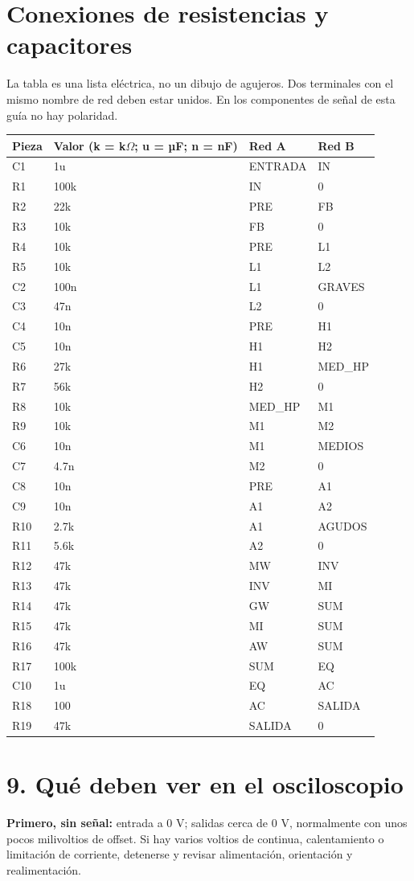 \documentclass[10pt,a4paper]{article}
\newcommand{\siguientepagina}{\clearpage}
\begin{document}
\clearpage
\section{Conexiones de resistencias y capacitores}
La tabla es una lista eléctrica, no un dibujo de agujeros. Dos terminales con el mismo nombre de red deben estar unidos. En los componentes de señal de esta guía no hay polaridad.
{\small\begin{longtable}{llll}\toprule Pieza & Valor (k = k\ensuremath{\Omega}; u = µF; n = nF) & Red A & Red B\\\midrule\endhead
C1 & 1u & ENTRADA & IN \\
R1 & 100k & IN & 0 \\
R2 & 22k & PRE & FB \\
R3 & 10k & FB & 0 \\
R4 & 10k & PRE & L1 \\
R5 & 10k & L1 & L2 \\
C2 & 100n & L1 & GRAVES \\
C3 & 47n & L2 & 0 \\
C4 & 10n & PRE & H1 \\
C5 & 10n & H1 & H2 \\
R6 & 27k & H1 & MED\_HP \\
R7 & 56k & H2 & 0 \\
R8 & 10k & MED\_HP & M1 \\
R9 & 10k & M1 & M2 \\
C6 & 10n & M1 & MEDIOS \\
C7 & 4.7n & M2 & 0 \\
C8 & 10n & PRE & A1 \\
C9 & 10n & A1 & A2 \\
R10 & 2.7k & A1 & AGUDOS \\
R11 & 5.6k & A2 & 0 \\
R12 & 47k & MW & INV \\
R13 & 47k & INV & MI \\
R14 & 47k & GW & SUM \\
R15 & 47k & MI & SUM \\
R16 & 47k & AW & SUM \\
R17 & 100k & SUM & EQ \\
C10 & 1u & EQ & AC \\
R18 & 100 & AC & SALIDA \\
R19 & 47k & SALIDA & 0 \\

\bottomrule\end{longtable}}
\siguientepagina
\section{9. Qué deben ver en el osciloscopio}
\textbf{Primero, sin señal:} entrada a 0 V; salidas cerca de 0 V, normalmente con unos pocos milivoltios de offset. Si hay varios voltios de continua, calentamiento o limitación de corriente, detenerse y revisar alimentación, orientación y realimentación.
\end{document}
